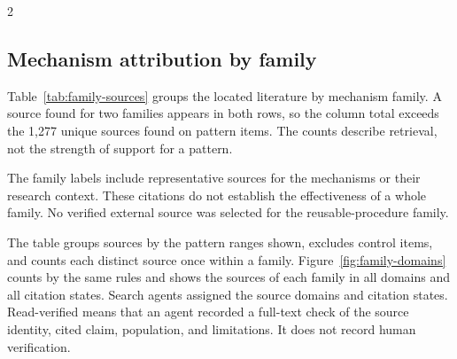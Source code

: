 \endgroup

\begin{multicols}{2}
\subsection{Mechanism attribution by family}

Table~\ref{tab:family-sources} groups the located literature by mechanism family. A source found for two families appears in both rows, so the column total exceeds the 1,277 unique sources found on pattern items. The counts describe retrieval, not the strength of support for a pattern.

The family labels include representative sources for the mechanisms or their research context. These citations do not establish the effectiveness of a whole family. No verified external source was selected for the reusable-procedure family.

The table groups sources by the pattern ranges shown, excludes control items, and counts each distinct source once within a family. Figure~\ref{fig:family-domains} counts by the same rules and shows the sources of each family in all domains and all citation states. Search agents assigned the source domains and citation states. Read-verified means that an agent recorded a full-text check of the source identity, cited claim, population, and limitations. It does not record human verification.
\end{multicols}

